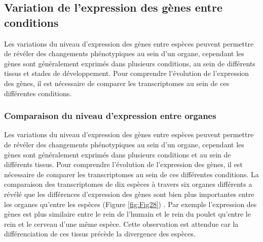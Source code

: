 \subsection{Variation de l’expression des gènes entre \glspl{condition}}
\label{sub:variation-condition}

Les variations du niveau d’expression des gènes entre espèces peuvent permettre de révéler des changements phénotypiques au sein d’un organe, cependant les gènes sont généralement exprimés dans plusieurs \glspl{condition}, au sein de différents tissus et stades de développement. Pour comprendre l’évolution de l’expression des gènes, il est nécessaire de comparer les transcriptomes au sein de ces différentes \glspl{condition}.

\subsubsection{Comparaison du niveau d’expression entre organes}
\label{subsub:variation-organes}

Les variations du niveau d’expression des gènes entre espèces peuvent permettre de révéler des changements phénotypiques au sein d’un organe, cependant les gènes sont généralement exprimés dans plusieurs \glspl{condition} et au sein de différents tissus. Pour comprendre l’évolution de l’expression des gènes, il est nécessaire de comparer les transcriptomes au sein de ces différentes \glspl{condition}. La comparaison des transcriptomes de dix espèces à travers six organes différents a révélé que les différences d’expression des gènes sont bien plus importantes entre les organes qu’entre les espèces (Figure \ref{fig:Fig28}) \citep{brawand_evolution_2011}. Par exemple l’expression des gènes est plus similaire entre le rein de l’humain et le rein du poulet qu’entre le rein et le cerveau d’une même espèce. Cette observation est attendue car la différenciation de ces tissus précède la divergence des espèces.

